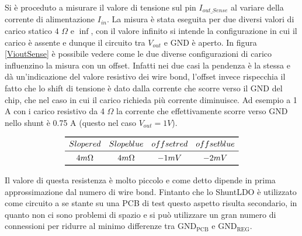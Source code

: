 Si è proceduto a misurare il valore di tensione sul pin $I_{out{\_}Sense}$ al variare della corrente di alimentazione $I_{in}$. 
La misura è stata eseguita per due diversi valori di carico statico $4$ $\Omega$ e $\inf$, con il valore infinito si intende la configurazione in cui il carico è assente e dunque il circuito tra $V_{out}$ e GND è aperto. 
In figura \ref{VioutSense} è possibile vedere come le due diverse configurazioni di carico influenzino la misura con un offset. 
Infatti nei due casi la pendenza è la stessa e dà un'indicazione del valore resistivo dei wire bond, l'offset invece rispecchia il fatto che lo shift di tensione è dato dalla corrente che scorre verso il GND del chip, che nel caso in cui il carico richieda più corrente diminuisce. Ad esempio a 1 A con i carico resistivo da 4 $\Omega$ la corrente che effettivamente scorre verso GND nello shunt è 0.75 A (questo nel caso $V_{out} = 1 V$).

\[
\begin{array}{cccc}

\toprule
Slope red & Slope blue & offset red & offset blue \\

\midrule

4 m \Omega & 4 m\Omega & -1 mV  & -2 mV \\

\bottomrule
\end{array}
\]

Il valore di questa resistenza è molto piccolo e come detto dipende in prima approssimazione dal numero di wire bond. Fintanto che lo ShuntLDO è utilizzato come circuito a se stante su una PCB di test questo aspetto risulta secondario, in quanto non ci sono problemi di spazio e si può utilizzare un gran numero di connessioni per ridurre al minimo differenze tra $\mathrm{GND_{PCB}}$ e $\mathrm{GND_{REG}}$.   

  
